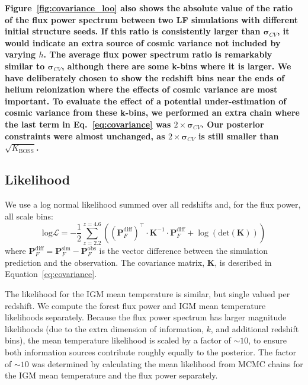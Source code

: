 \textbf{Figure~\ref{fig:covariance_loo} also shows the absolute value of the ratio of the flux power spectrum between two LF simulations with different initial structure seeds. If this ratio is consistently larger than $\boldsymbol{\sigma}_{CV}$, it would indicate an extra source of cosmic variance not included by varying $h$. The average flux power spectrum ratio is remarkably similar to $\boldsymbol{\sigma}_{CV}$, although there are some  k-bins where it is larger. We have deliberately chosen to show the redshift bins near the ends of helium reionization where the effects of cosmic variance are most important. To evaluate the effect of a potential under-estimation of cosmic variance from these k-bins, we performed an extra chain where the last term in Eq.~\ref{eq:covariance} was $2\times \boldsymbol{\sigma}_{CV}$. Our posterior constraints were almost unchanged, as $2 \times \boldsymbol{\sigma}_{CV}$ is still smaller than $\sqrt{K_\mathrm{BOSS}}$.}

\subsection{Likelihood}\label{sec:likelihood}

We use a log normal likelihood summed over all redshifts and, for the flux power, all scale bins:
\begin{equation}
    \mathrm{log}\mathcal{L} = -\frac{1}{2} \sum_{z=2.2}^{z=4.6} \left(\left(\boldsymbol{P}_F^{\mathrm{diff}}\right)^\top \cdot \boldsymbol{K}^{-1} \cdot \boldsymbol{P}_F^{\mathrm{diff}} + \log\left( \mathrm{det}(\boldsymbol{K})\right)\right)
    \label{eq:likelihood}
\end{equation}
where $\boldsymbol{P}_F^{\mathrm{diff}} = \boldsymbol{P}_F^{\mathrm{sim}} - \boldsymbol{P}_F^{\mathrm{obs}}$ is the vector difference between the simulation prediction and the observation.
The covariance matrix, $\boldsymbol{K}$, is described in Equation~\ref{eq:covariance}. 

The likelihood for the IGM mean temperature is similar, but single valued per redshift.
We compute the \lya forest flux power and IGM mean temperature likelihoods separately.
Because the flux power spectrum has larger magnitude likelihoods (due to the extra dimension of information, $k$, and additional redshift bins), the mean temperature likelihood is scaled by a factor of $\sim 10$, to ensure both information sources contribute roughly equally to the posterior.
The factor of $\sim 10$ was determined by calculating the mean likelihood from MCMC chains for the IGM mean temperature and the flux power separately.

